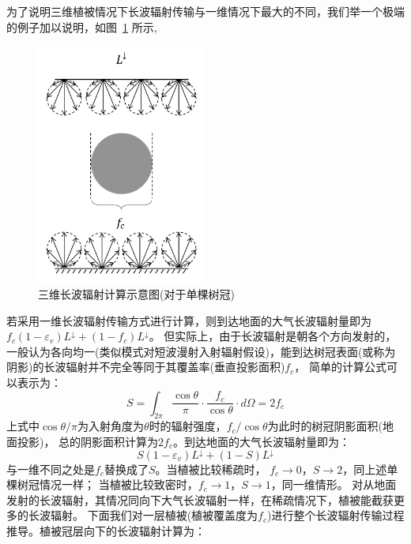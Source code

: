 为了说明三维植被情况下长波辐射传输与一维情况下最大的不同，我们举一个极端的例子加以说明，如图~\ref{fig:单棵树冠长波辐射传输示意图} 所示,
{
\begin{figure}[htb]
\centering
\includegraphics[width=0.5\textwidth]{Figures/辐射过程及辐射通量计算/单棵树冠长波辐射传输示意图.png}
\caption{三维长波辐射计算示意图(对于单棵树冠)}
\label{fig:单棵树冠长波辐射传输示意图}
\end{figure}
}
%
若采用一维长波辐射传输方式进行计算，则到达地面的大气长波辐射量即为$f_c\left(1-\varepsilon_v\right)L^\downarrow+\left(1-f_c\right)L^\downarrow$。
但实际上，由于长波辐射是朝各个方向发射的，一般认为各向均一(类似模式对短波漫射入射辐射假设)，能到达树冠表面(或称为阴影)的长波辐射并不完全等同于其覆盖率(垂直投影面积)$f_c$，
简单的计算公式可以表示为：
\begin{equation}
S=\int_{2 \pi} \frac{\cos \theta}{\pi} \cdot \frac{f_{c}}{\cos \theta} \cdot d \Omega=2 f_{c}
\end{equation}
上式中$\cos{\theta}/\pi$为入射角度为$\theta$时的辐射强度，$f_c/\cos{\theta}$为此时的树冠阴影面积(地面投影)，
总的阴影面积计算为$2f_c$。到达地面的大气长波辐射量即为：
\begin{equation}
S\left(1-\varepsilon_{v}\right) L ^\downarrow+(1-S) L ^\downarrow
\end{equation}
与一维不同之处是$f_c$替换成了$S$。当植被比较稀疏时，
$f_c\rightarrow0$，$S\rightarrow2$，同上述单棵树冠情况一样；
当植被比较致密时，$f_c\rightarrow1$，$S\rightarrow1$，同一维情形。
对从地面发射的长波辐射，其情况同向下大气长波辐射一样，在稀疏情况下，植被能截获更多的长波辐射。
下面我们对一层植被(植被覆盖度为$f_c$)进行整个长波辐射传输过程推导。植被冠层向下的长波辐射计算为：
